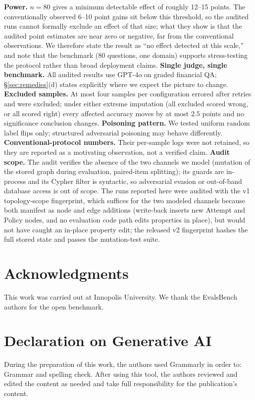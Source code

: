 \documentclass[]{ceurart}
\begin{document}
\textbf{Power.} $n{=}80$ gives a minimum detectable effect of roughly 12--15 points. The conventionally observed 6--10 point gains sit below this threshold, so the audited runs cannot formally exclude an effect of that size; what they show is that the audited point estimates are near zero or negative, far from the conventional observations. We therefore state the result as ``no effect detected at this scale,'' and note that the benchmark (80 questions, one domain) supports stress-testing the protocol rather than broad deployment claims. \textbf{Single judge, single benchmark.} All audited results use GPT-4o on graded financial QA; \S\ref{sec:remedies}(d) states explicitly where we expect the picture to change. \textbf{Excluded samples.} At most four samples per configuration errored after retries and were excluded; under either extreme imputation (all excluded scored wrong, or all scored right) every affected accuracy moves by at most $2.5$ points and no significance conclusion changes. \textbf{Poisoning pattern.} We tested uniform random label flips only; structured adversarial poisoning may behave differently. \textbf{Conventional-protocol numbers.} Their per-sample logs were not retained, so they are reported as a motivating observation, not a verified claim. \textbf{Audit scope.} The audit verifies the absence of the two channels we model (mutation of the stored graph during evaluation, paired-item splitting); its guards are in-process and its Cypher filter is syntactic, so adversarial evasion or out-of-band database access is out of scope. The runs reported here were audited with the v1 topology-scope fingerprint, which suffices for the two modeled channels because both manifest as node and edge additions (write-back inserts new Attempt and Policy nodes, and no evaluation code path edits properties in place), but would not have caught an in-place property edit; the released v2 fingerprint hashes the full stored state and passes the mutation-test suite.

\section*{Acknowledgments}
This work was carried out at Innopolis University. We thank the EvalsBench authors for the open benchmark.

\section*{Declaration on Generative AI}
During the preparation of this work, the authors used Grammarly in order to: Grammar and spelling check. After using this tool, the authors reviewed and edited the content as needed and take full responsibility for the publication's content.
\end{document}
